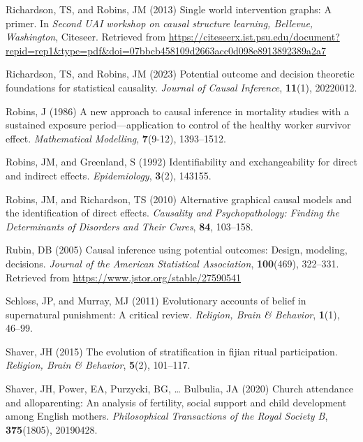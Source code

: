 \documentclass[
  single column]{article}
\newlength{\cslhangindent}
\newenvironment{CSLReferences}[2] %
 {\begin{list}{}{%
  \setlength{\itemindent}{0pt}
  \setlength{\leftmargin}{0pt}
  \setlength{\parsep}{0pt}
  \ifodd #1
   \setlength{\leftmargin}{\cslhangindent}
   \setlength{\itemindent}{-1\cslhangindent}
  \fi
  \setlength{\itemsep}{#2\baselineskip}}}
 {\end{list}}
\begin{document}
\begin{CSLReferences}{1}{0}
Richardson, TS, and Robins, JM (2013) Single world intervention graphs:
A primer. In \emph{Second UAI workshop on causal structure learning,
{B}ellevue, {W}ashington}, Citeseer. Retrieved from
\url{https://citeseerx.ist.psu.edu/document?repid=rep1&type=pdf&doi=07bbcb458109d2663acc0d098e8913892389a2a7}

Richardson, TS, and Robins, JM (2023) Potential outcome and decision
theoretic foundations for statistical causality. \emph{Journal of Causal
Inference}, \textbf{11}(1), 20220012.

Robins, J (1986) A new approach to causal inference in mortality studies
with a sustained exposure period---application to control of the healthy
worker survivor effect. \emph{Mathematical Modelling}, \textbf{7}(9-12),
1393--1512.

Robins, JM, and Greenland, S (1992) Identifiability and exchangeability
for direct and indirect effects. \emph{Epidemiology}, \textbf{3}(2),
143155.

Robins, JM, and Richardson, TS (2010) Alternative graphical causal
models and the identification of direct effects. \emph{Causality and
Psychopathology: Finding the Determinants of Disorders and Their Cures},
\textbf{84}, 103--158.

Rubin, DB (2005) Causal inference using potential outcomes: Design,
modeling, decisions. \emph{Journal of the American Statistical
Association}, \textbf{100}(469), 322--331. Retrieved from
\url{https://www.jstor.org/stable/27590541}

Schloss, JP, and Murray, MJ (2011) Evolutionary accounts of belief in
supernatural punishment: A critical review. \emph{Religion, Brain \&
Behavior}, \textbf{1}(1), 46--99.

Shaver, JH (2015) The evolution of stratification in fijian ritual
participation. \emph{Religion, Brain \& Behavior}, \textbf{5}(2),
101--117.

Shaver, JH, Power, EA, Purzycki, BG, \ldots{} Bulbulia, JA (2020) Church
attendance and alloparenting: An analysis of fertility, social support
and child development among {E}nglish mothers. \emph{Philosophical
Transactions of the Royal Society B}, \textbf{375}(1805), 20190428.


\end{CSLReferences}
\end{document}
